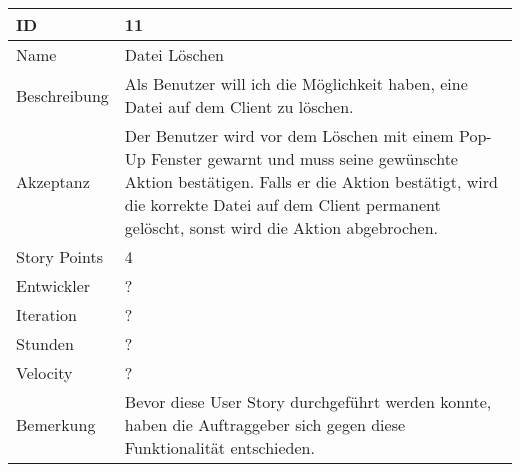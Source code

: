 \begin{table}[htbp]
    \begin{minipage}{\linewidth}
        \setlength{\tymax}{0.5\linewidth}
        \centering
        \small
        \begin{tabulary}{\textwidth}{|l|p{10cm}|} \hline
            ID   &11\\\hline
            Name  &Datei Löschen\\\hline
	    Beschreibung&Als Benutzer will ich die Möglichkeit haben, eine Datei auf dem Client zu löschen.\\\hline
	    Akzeptanz &Der Benutzer wird vor dem Löschen mit einem Pop-Up Fenster gewarnt und muss seine gewünschte Aktion bestätigen. Falls er die Aktion bestätigt, wird die korrekte Datei auf dem Client permanent gelöscht, sonst wird die Aktion abgebrochen.\\\hline
            Story Points&4\\\hline
            Entwickler &?\\\hline
            Iteration &?\\\hline
            Stunden  &?\\\hline
            Velocity &?\\\hline
            Bemerkung & Bevor diese User Story durchgeführt werden konnte, haben die Auftraggeber sich gegen diese Funktionalität entschieden.
            \\\hline
        \end{tabulary}
    \end{minipage}
\end{table}



